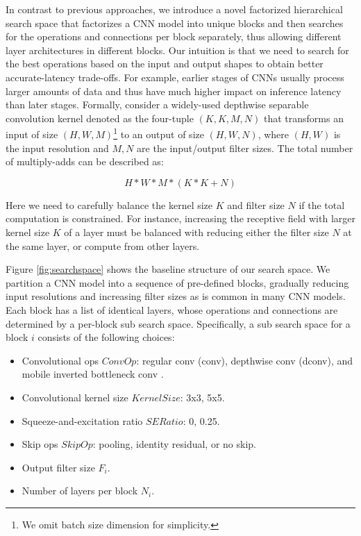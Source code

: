 \documentclass[10pt,twocolumn,letterpaper]{article}
\begin{document}
In contrast to previous approaches, we introduce a novel {factorized hierarchical search space} that factorizes a CNN model into unique blocks and then searches for the operations and connections per block separately, thus allowing different layer architectures in different blocks.
Our intuition is that we need to search for the best operations based on the input and output shapes to obtain better accurate-latency trade-offs. For example, earlier stages of CNNs usually process larger amounts of data and thus have much higher impact on inference latency than later stages. Formally, consider a widely-used depthwise separable convolution \cite{mobilenetv117} kernel denoted as the four-tuple $(K, K,  M, N)$ that transforms an input of size $(H, W, M)$\footnote{We omit batch size dimension for simplicity.} to an output of size $(H, W, N)$, where $(H, W)$ is the input resolution and $M, N$ are the input/output filter sizes. The total number of multiply-adds  can be described as:

\begin{equation}
H * W * M * (K * K  +  N)
\end{equation}

\noindent
Here we need to carefully balance the kernel size $K$ and filter size $N$ if the total computation is constrained. For instance, increasing the receptive field with larger kernel size $K$ of a layer must be balanced with reducing either the filter size $N$ at the same layer, or compute from other layers.

Figure \ref{fig:searchspace} shows the baseline structure of our search space. We partition a CNN model into a sequence of pre-defined blocks, gradually reducing  input resolutions and increasing filter sizes as is common in many CNN models. Each block has a list of identical layers, whose operations and connections are determined by a per-block sub search space. Specifically, a sub search space for a block $i$ consists of the following choices:

\begin{itemize}
	\small	
	 \setlength\itemsep{0em}
	\item Convolutional ops $ConvOp$: regular conv (conv), depthwise conv (dconv), and mobile inverted bottleneck conv \cite{mobilenetv218}.
	\item Convolutional kernel size $KernelSize$: 3x3, 5x5.
	\item Squeeze-and-excitation \cite{senet18} ratio $SERatio$: 0, 0.25.
	\item Skip ops $SkipOp$:  pooling, identity residual, or no skip.
	\item Output filter size $F_i$.
	\item Number of layers per block $N_i$.
\end{itemize}
\end{document}
